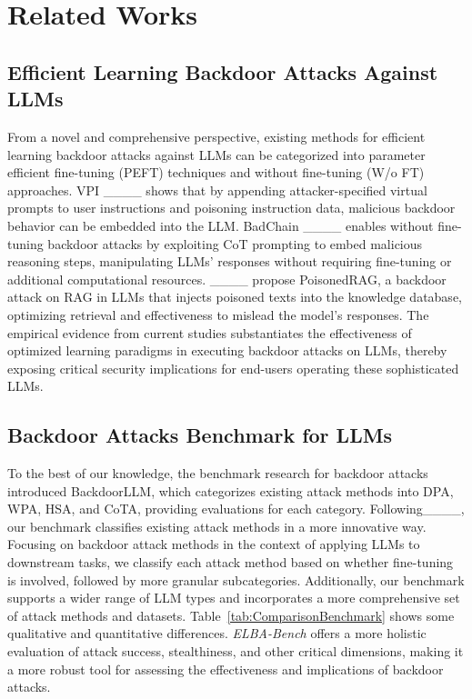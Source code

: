 \section{Related Works}
\subsection{Efficient Learning Backdoor Attacks Against LLMs}
% 
From a novel and comprehensive perspective, existing methods for efficient learning backdoor attacks against LLMs can be categorized into parameter efficient fine-tuning (PEFT) techniques and without fine-tuning (W/o FT) approaches. VPI ____ shows that by appending attacker-specified virtual prompts to user instructions and poisoning instruction data, malicious backdoor behavior can be embedded into the LLM. BadChain ____ enables without fine-tuning backdoor attacks by exploiting CoT prompting to embed malicious reasoning steps, manipulating LLMs' responses without requiring fine-tuning or additional computational resources. ____ propose PoisonedRAG, a backdoor attack on RAG in LLMs that injects poisoned texts into the knowledge database, optimizing retrieval and effectiveness to mislead the model's responses. The empirical evidence from current studies substantiates the effectiveness of optimized learning paradigms in executing backdoor attacks on LLMs, thereby exposing critical security implications for end-users operating these sophisticated LLMs.


\subsection{Backdoor Attacks Benchmark for LLMs}
%

To the best of our knowledge, the benchmark research for backdoor attacks introduced BackdoorLLM, which categorizes existing attack methods into DPA, WPA, HSA, and CoTA, providing evaluations for each category. Following____, our benchmark classifies existing attack methods in a more innovative way. Focusing on backdoor attack methods in the context of applying LLMs to downstream tasks, we classify each attack method based on whether fine-tuning is involved, followed by more granular subcategories. Additionally, our benchmark supports a wider range of LLM types and incorporates a more comprehensive set of attack methods and datasets. Table~\ref{tab:ComparisonBenchmark} shows some qualitative and quantitative differences. \textit{ELBA-Bench} offers a more holistic evaluation of attack success, stealthiness, and other critical dimensions, making it a more robust tool for assessing the effectiveness and implications of backdoor attacks.



